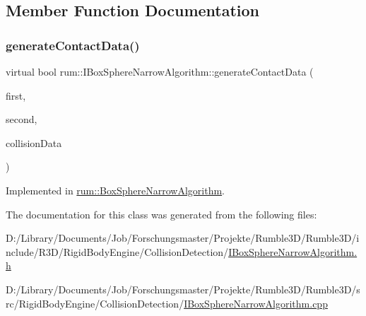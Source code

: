 \subsection{Member Function Documentation}
\mbox{\label{classrum_1_1_i_box_sphere_narrow_algorithm_a4b32bfe38ae668e68b5f6c400cf03e78}} 
\subsubsection{\texorpdfstring{generate\+Contact\+Data()}{generateContactData()}}
{\footnotesize\ttfamily virtual bool rum\+::\+I\+Box\+Sphere\+Narrow\+Algorithm\+::generate\+Contact\+Data (\begin{DoxyParamCaption}\item[{\mbox{\hyperlink{classrum_1_1_collision_box}{Collision\+Box}} $\ast$}]{first,  }\item[{\mbox{\hyperlink{classrum_1_1_collision_sphere}{Collision\+Sphere}} $\ast$}]{second,  }\item[{\mbox{\hyperlink{classrum_1_1_collision_data}{Collision\+Data}} \&}]{collision\+Data }\end{DoxyParamCaption})\hspace{0.3cm}{\ttfamily [pure virtual]}}



Implemented in \mbox{\hyperlink{classrum_1_1_box_sphere_narrow_algorithm_aabb8b78607bf604fa7455da4a908c794}{rum\+::\+Box\+Sphere\+Narrow\+Algorithm}}.



The documentation for this class was generated from the following files\+:\begin{DoxyCompactItemize}
\item 
D\+:/\+Library/\+Documents/\+Job/\+Forschungsmaster/\+Projekte/\+Rumble3\+D/\+Rumble3\+D/include/\+R3\+D/\+Rigid\+Body\+Engine/\+Collision\+Detection/\mbox{\hyperlink{_i_box_sphere_narrow_algorithm_8h}{I\+Box\+Sphere\+Narrow\+Algorithm.\+h}}\item 
D\+:/\+Library/\+Documents/\+Job/\+Forschungsmaster/\+Projekte/\+Rumble3\+D/\+Rumble3\+D/src/\+Rigid\+Body\+Engine/\+Collision\+Detection/\mbox{\hyperlink{_i_box_sphere_narrow_algorithm_8cpp}{I\+Box\+Sphere\+Narrow\+Algorithm.\+cpp}}\end{DoxyCompactItemize}
